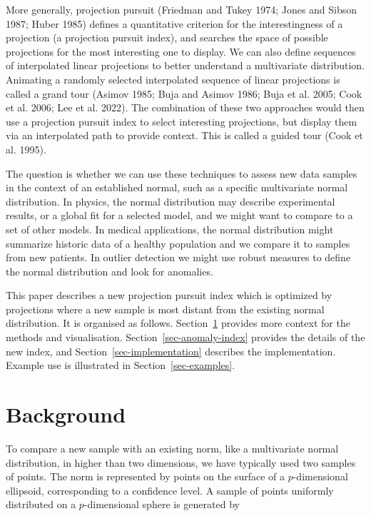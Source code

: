 \documentclass[
  12pt,
]{interact}
\begin{document}
More generally, projection pursuit (Friedman and Tukey 1974; Jones and
Sibson 1987; Huber 1985) defines a quantitative criterion for the
interestingness of a projection (a projection pursuit index), and
searches the space of possible projections for the most interesting one
to display. We can also define sequences of interpolated linear
projections to better understand a multivariate distribution. Animating
a randomly selected interpolated sequence of linear projections is
called a grand tour (Asimov 1985; Buja and Asimov 1986; Buja et al.
2005; Cook et al. 2006; Lee et al. 2022). The combination of these two
approaches would then use a projection pursuit index to select
interesting projections, but display them via an interpolated path to
provide context. This is called a guided tour (Cook et al. 1995).

The question is whether we can use these techniques to assess new data
samples in the context of an established normal, such as a specific
multivariate normal distribution. In physics, the normal distribution
may describe experimental results, or a global fit for a selected model,
and we might want to compare to a set of other models. In medical
applications, the normal distribution might summarize historic data of a
healthy population and we compare it to samples from new patients. In
outlier detection we might use robust measures to define the normal
distribution and look for anomalies.

This paper describes a new projection pursuit index which is optimized
by projections where a new sample is most distant from the existing
normal distribution. It is organised as follows.
Section~\ref{sec-background} provides more context for the methods and
visualisation. Section~\ref{sec-anomaly-index} provides the details of
the new index, and Section~\ref{sec-implementation} describes the
implementation. Example use is illustrated in
Section~\ref{sec-examples}.

\section{Background}\label{sec-background}

To compare a new sample with an existing norm, like a multivariate
normal distribution, in higher than two dimensions, we have typically
used two samples of points. The norm is represented by points on the
surface of a \(p\)-dimensional ellipsoid, corresponding to a confidence
level. A sample of points uniformly distributed on a \(p\)-dimensional
sphere is generated by
\end{document}
